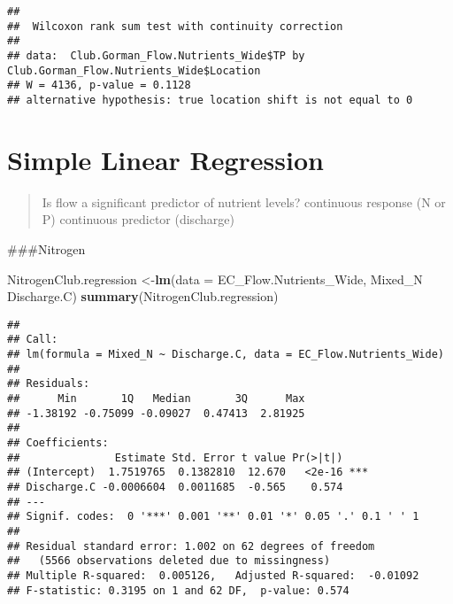 \documentclass[]{article}
\newenvironment{Shaded}{\begin{snugshade}}{\end{snugshade}}
\newcommand{\CommentTok}[1]{\textcolor[rgb]{0.56,0.35,0.01}{\textit{#1}}}
\newcommand{\DataTypeTok}[1]{\textcolor[rgb]{0.13,0.29,0.53}{#1}}
\newcommand{\KeywordTok}[1]{\textcolor[rgb]{0.13,0.29,0.53}{\textbf{#1}}}
\newcommand{\NormalTok}[1]{#1}
\newcommand{\OperatorTok}[1]{\textcolor[rgb]{0.81,0.36,0.00}{\textbf{#1}}}
\newcommand{\StringTok}[1]{\textcolor[rgb]{0.31,0.60,0.02}{#1}}
\begin{document}
\begin{verbatim}
## 
##  Wilcoxon rank sum test with continuity correction
## 
## data:  Club.Gorman_Flow.Nutrients_Wide$TP by Club.Gorman_Flow.Nutrients_Wide$Location
## W = 4136, p-value = 0.1128
## alternative hypothesis: true location shift is not equal to 0
\end{verbatim}

\hypertarget{simple-linear-regression}{%
\section{Simple Linear Regression}\label{simple-linear-regression}}

\begin{quote}
Is flow a significant predictor of nutrient levels? continuous response
(N or P) continuous predictor (discharge)
\end{quote}

\#\#\#Nitrogen

\begin{Shaded}
\begin{Highlighting}[]
\NormalTok{NitrogenClub.regression <-}\KeywordTok{lm}\NormalTok{(}\DataTypeTok{data =}\NormalTok{ EC_Flow.Nutrients_Wide, Mixed_N }\OperatorTok{~}\StringTok{ }\NormalTok{Discharge.C)}
\KeywordTok{summary}\NormalTok{(NitrogenClub.regression)}
\end{Highlighting}
\end{Shaded}

\begin{verbatim}
## 
## Call:
## lm(formula = Mixed_N ~ Discharge.C, data = EC_Flow.Nutrients_Wide)
## 
## Residuals:
##      Min       1Q   Median       3Q      Max 
## -1.38192 -0.75099 -0.09027  0.47413  2.81925 
## 
## Coefficients:
##               Estimate Std. Error t value Pr(>|t|)    
## (Intercept)  1.7519765  0.1382810  12.670   <2e-16 ***
## Discharge.C -0.0006604  0.0011685  -0.565    0.574    
## ---
## Signif. codes:  0 '***' 0.001 '**' 0.01 '*' 0.05 '.' 0.1 ' ' 1
## 
## Residual standard error: 1.002 on 62 degrees of freedom
##   (5566 observations deleted due to missingness)
## Multiple R-squared:  0.005126,   Adjusted R-squared:  -0.01092 
## F-statistic: 0.3195 on 1 and 62 DF,  p-value: 0.574
\end{verbatim}

\begin{Shaded}
\end{Shaded}
\end{document}
